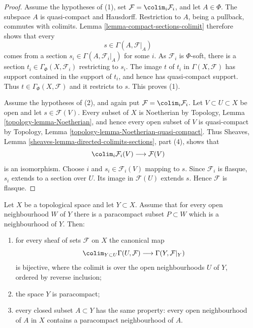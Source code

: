 \begin{proof}
Assume the hypotheses of (1), set
$\mathcal{F} = \colim_i \mathcal{F}_i$, and let $A \in \Phi$. The subspace
$A$ is quasi-compact and Hausdorff. Restriction to $A$, being a pullback,
commutes with colimits. Lemma \ref{lemma-compact-sections-colimit} therefore
shows that every
$$
s \in \Gamma(A, \mathcal{F}|_A)
$$
comes from a section $s_i \in \Gamma(A, \mathcal{F}_i|_A)$ for some $i$.
As $\mathcal{F}_i$ is $\Phi$-soft, there is a section
$t_i \in \Gamma_\Phi(X, \mathcal{F}_i)$ restricting to $s_i$. The image
$t$ of $t_i$ in $\Gamma(X, \mathcal{F})$ has support contained in the
support of $t_i$, and hence has quasi-compact support. Thus
$t \in \Gamma_\Phi(X, \mathcal{F})$ and it restricts to $s$. This proves
(1).

Assume the hypotheses of (2), and again put
$\mathcal{F} = \colim_i \mathcal{F}_i$. Let $V \subset U \subset X$ be
open and let $s \in \mathcal{F}(V)$. Every subset of $X$ is Noetherian by
Topology, Lemma \ref{topology-lemma-Noetherian}, and hence every open subset
of $V$ is quasi-compact by Topology, Lemma
\ref{topology-lemma-Noetherian-quasi-compact}. Thus Sheaves, Lemma
\ref{sheaves-lemma-directed-colimits-sections}, part (4), shows that
$$
\colim_i \mathcal{F}_i(V) \longrightarrow \mathcal{F}(V)
$$
is an isomorphism. Choose $i$ and $s_i \in \mathcal{F}_i(V)$ mapping to
$s$. Since $\mathcal{F}_i$ is flasque, $s_i$ extends to a section over $U$.
Its image in $\mathcal{F}(U)$ extends $s$. Hence $\mathcal{F}$ is flasque.
\end{proof}


\begin{lemma}
\label{lemma-sections-colimit-paracompact-neighbourhoods}
Let $X$ be a topological space and let $Y \subset X$. Assume that for every
open neighbourhood $W$ of $Y$ there is a paracompact subset $P \subset W$
which is a neighbourhood of $Y$. Then:
\begin{enumerate}
\item for every sheaf of sets $\mathcal{F}$ on $X$ the canonical map
$$
\colim_{Y \subset U} \Gamma(U, \mathcal{F})
\longrightarrow \Gamma(Y, \mathcal{F}|_Y)
$$
is bijective, where the colimit is over the open neighbourhoods $U$ of $Y$,
ordered by reverse inclusion;
\item the space $Y$ is paracompact;
\item every closed subset $A \subset Y$ has the same property: every open
neighbourhood of $A$ in $X$ contains a paracompact neighbourhood of $A$.
\end{enumerate}
\end{lemma}

